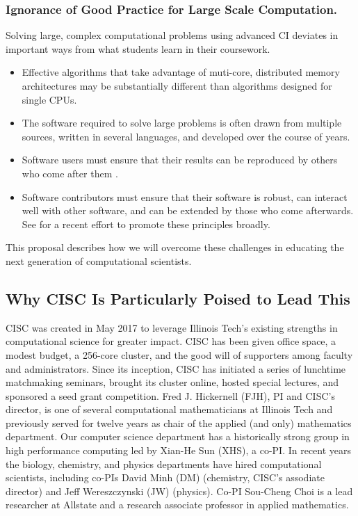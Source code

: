 \documentclass[11pt]{NSFamsart}
\begin{document}
\subsubsection*{Ignorance of Good Practice for Large Scale Computation.}  Solving large, complex computational problems using advanced CI deviates in important ways from what students learn in their coursework. 

\begin{itemize}

\item Effective algorithms that take advantage of muti-core, distributed memory architectures may be substantially different than algorithms designed for single CPUs.

\item The software required to solve large problems is often drawn from multiple sources, written in several languages, and developed over the course of years.

\item Software users must ensure that their results can be reproduced by others who come after them \cite{Pen11}.  

\item Software contributors must ensure that their software is robust, can interact well with other software, and can be extended by those who come afterwards.  See \cite{BSS18} for a recent effort to promote these principles broadly.

\end{itemize}

This proposal describes how we will overcome these challenges in educating the next generation of computational scientists.

\subsection{Why CISC Is Particularly Poised to Lead This}
CISC was created in May 2017 to leverage Illinois Tech’s existing strengths in computational science for greater impact.  CISC has been given office space, a modest budget, a 256-core cluster, and the good will of supporters among faculty and administrators.  Since its inception, CISC has initiated a series of lunchtime matchmaking seminars, brought its cluster online, hosted special lectures, and sponsored a seed grant competition. Fred J. Hickernell (FJH), PI and CISC’s director, is one of several computational mathematicians at Illinois Tech and previously served for twelve years as chair of the applied (and only) mathematics department.  Our computer science department has a historically strong group in high performance computing led by Xian-He Sun (XHS), a co-PI.  In recent years the biology, chemistry, and physics departments have hired computational scientists, including co-PIs David Minh (DM) (chemistry, CISC's assodiate director) and Jeff Wereszczynski (JW) (physics).  Co-PI Sou-Cheng Choi is a lead researcher at Allstate and a research associate professor in applied mathematics.
\end{document}

